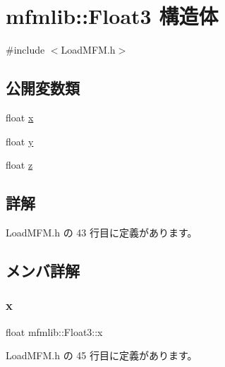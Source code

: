 \hypertarget{structmfmlib_1_1_float3}{}\section{mfmlib\+:\+:Float3 構造体}
\label{structmfmlib_1_1_float3}


{\ttfamily \#include $<$Load\+M\+F\+M.\+h$>$}

\subsection*{公開変数類}
\begin{DoxyCompactItemize}
\item 
float \mbox{\hyperlink{structmfmlib_1_1_float3_a5880c2d55a08df637466393a2d32901b}{x}}
\item 
float \mbox{\hyperlink{structmfmlib_1_1_float3_a5dfb8a3bd9aba9ae2ed8dc6b8aae1c7f}{y}}
\item 
float \mbox{\hyperlink{structmfmlib_1_1_float3_a9ade46ae48697f268fc476c753c5db59}{z}}
\end{DoxyCompactItemize}


\subsection{詳解}


 Load\+M\+F\+M.\+h の 43 行目に定義があります。



\subsection{メンバ詳解}
\mbox{\label{structmfmlib_1_1_float3_a5880c2d55a08df637466393a2d32901b}} 
\subsubsection{\texorpdfstring{x}{x}}
{\footnotesize\ttfamily float mfmlib\+::\+Float3\+::x}



 Load\+M\+F\+M.\+h の 45 行目に定義があります。

\mbox{\label{structmfmlib_1_1_float3_a5dfb8a3bd9aba9ae2ed8dc6b8aae1c7f}} 
